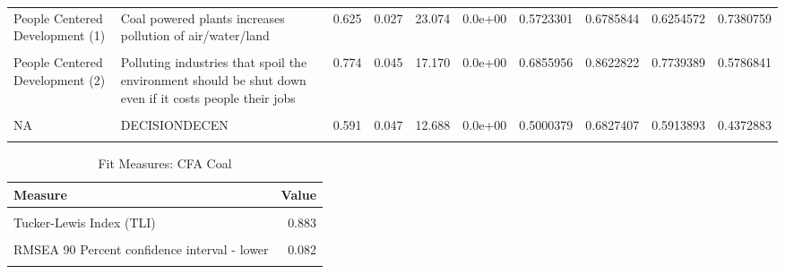 \documentclass[
]{article}
\begin{document}
\begin{landscape}
\begin{landscape}
\begin{table}[!h]
{\begin{tabular}[t]{l>{\raggedright\arraybackslash}p{4cm}rrrrrrrr}
\addlinespace
People Centered Development (1) & Coal powered plants increases pollution of air/water/land & 0.625 & 0.027 & 23.074 & 0.0e+00 & 0.5723301 & 0.6785844 & 0.6254572 & 0.7380759\\
\cellcolor{gray!6}{People Centered Development (2)} & \cellcolor{gray!6}{Coal powered plants is leading to displacement of people from their land} & \cellcolor{gray!6}{0.798} & \cellcolor{gray!6}{0.043} & \cellcolor{gray!6}{18.744} & \cellcolor{gray!6}{0.0e+00} & \cellcolor{gray!6}{0.7146346} & \cellcolor{gray!6}{0.8815425} & \cellcolor{gray!6}{0.7980885} & \cellcolor{gray!6}{0.6290495}\\
People Centered Development (2) & Polluting industries that spoil the environment should be shut down even if it costs people their jobs & 0.774 & 0.045 & 17.170 & 0.0e+00 & 0.6855956 & 0.8622822 & 0.7739389 & 0.5786841\\
\cellcolor{gray!6}{People Centered Development (2)} & \cellcolor{gray!6}{The government should own most large businesses and industries} & \cellcolor{gray!6}{0.694} & \cellcolor{gray!6}{0.043} & \cellcolor{gray!6}{16.162} & \cellcolor{gray!6}{0.0e+00} & \cellcolor{gray!6}{0.6095106} & \cellcolor{gray!6}{0.7777478} & \cellcolor{gray!6}{0.6936292} & \cellcolor{gray!6}{0.5469633}\\
NA & DECISIONDECEN & 0.591 & 0.047 & 12.688 & 0.0e+00 & 0.5000379 & 0.6827407 & 0.5913893 & 0.4372883\\
\addlinespace
\cellcolor{gray!6}{NA} & \cellcolor{gray!6}{Coal powered plants is a mark of pride for our nation} & \cellcolor{gray!6}{0.348} & \cellcolor{gray!6}{0.079} & \cellcolor{gray!6}{4.424} & \cellcolor{gray!6}{9.7e-06} & \cellcolor{gray!6}{0.1940008} & \cellcolor{gray!6}{0.5026243} & \cellcolor{gray!6}{0.3483126} & \cellcolor{gray!6}{0.2151565}\\
\bottomrule
\end{tabular}}
\end{table}
\end{landscape}

\end{landscape}

\begin{table}[!h]

\caption{\label{tab:unnamed-chunk-61}Fit Measures: CFA Coal}
\centering
\begin{tabular}[t]{lr}
\toprule
Measure & Value\\
\midrule
\cellcolor{gray!6}{Comparative Fit Index (CFI)} & \cellcolor{gray!6}{0.917}\\
Tucker-Lewis Index (TLI) & 0.883\\
\cellcolor{gray!6}{Root Mean Square Error of Approximation(RMSEA)} & \cellcolor{gray!6}{0.073}\\
RMSEA 90 Percent confidence interval - lower & 0.082\\
\cellcolor{gray!6}{RMSEA 90 Percent confidence interval - upper} & \cellcolor{gray!6}{0.064}\\
\bottomrule
\end{tabular}
\end{table}
\end{document}
